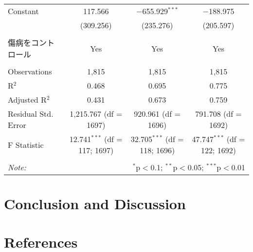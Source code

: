 \documentclass{jsarticle}
\begin{document}
\begin{table}[!htbp]
\begin{tabular}{@{\extracolsep{5pt}}lccc}
 Constant & 117.566 & $-$655.929$^{***}$ & $-$188.975 \\ 
  & (309.256) & (235.276) & (205.597) \\ 
  & & & \\ 
  傷病をコントロール & Yes & Yes & Yes \\
\hline \\[-1.8ex] 
Observations & 1,815 & 1,815 & 1,815 \\ 
R$^{2}$ & 0.468 & 0.695 & 0.775 \\ 
Adjusted R$^{2}$ & 0.431 & 0.673 & 0.759 \\ 
Residual Std. Error & 1,215.767 (df = 1697) & 920.961 (df = 1696) & 791.708 (df = 1692) \\ 
F Statistic & 12.741$^{***}$ (df = 117; 1697) & 32.705$^{***}$ (df = 118; 1696) & 47.747$^{***}$ (df = 122; 1692) \\ 
\hline 
\hline \\[-1.8ex] 
\textit{Note:}  & \multicolumn{3}{r}{$^{*}$p$<$0.1; $^{**}$p$<$0.05; $^{***}$p$<$0.01} \\ 
\end{tabular} 
\end{table}


\section{Conclusion and Discussion}



\section{References}
\end{document}
